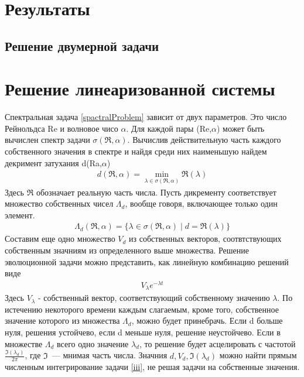 \section*{Результаты}
\subsection{Решение двумерной задачи}



\section*{Решение линеаризованной системы} 

Спектральная задача \ref{spactralProblem} зависит от двух параметров. Это число Рейнольдса Re и волновое чисо $\alpha$. Для каждой пары (Re,$\alpha$) может быть вычислен спектр задачи $\sigma(\Re,\alpha)$. Вычислив действительную часть каждого собственного значения в спектре и найдя среди них наименьшую найдем декримент затухания d(Ra,$\alpha$)
\begin{gather}
 d(\Re,\alpha) = \min_{\lambda \in \sigma(\Re,\alpha)} \mathfrak{R}(\lambda)
\end{gather}
Здесь $\mathfrak{R}$ обозначает реальную часть числа. Пусть дикременту соответствует множество собственных чисел $\Lambda_d$, вообще говоря, включающее только один элемент.
\begin{gather}
 \Lambda_d(\Re,\alpha) = \{ \lambda \in \sigma(\Re,\alpha) \mid d = \mathfrak{R}(\lambda) \}
\end{gather}
Составим еще одно множество $V_d$ из собственных векторов, соотвтствующих собственным значниям из определенного выше множества. Решение эволюционной задачи можно представить, как линейную комбинацию решений виде 
\begin{gather}
 V_\lambda e^{-\lambda t}
\end{gather}
Здесь $V_\lambda$ - собственный вектор, соответствующий собственному значению $\lambda$. 
По истечению некоторого времени каждым слагаемым, кроме того, собственное значение которого из
множества $\Lambda_d$, можно будет принебрачь. Если d больше нуля, решения устойчево, если d 
меньше нуля, решение неустойчево. Если в множестве $\Lambda_d$ всего одно значение $\lambda_d$, то 
решение будет асцелировать с частотой $\frac{\mathfrak{I}(\lambda_d)}{2\pi}$, где 
$\mathfrak{I}$~--- мнимая часть числа. Значния $d, V_d, \mathfrak{I}(\lambda_d)$ можно найти 
прямым численным интегрирование задачи \ref{iii}, не решая задачи на собственные значения.



